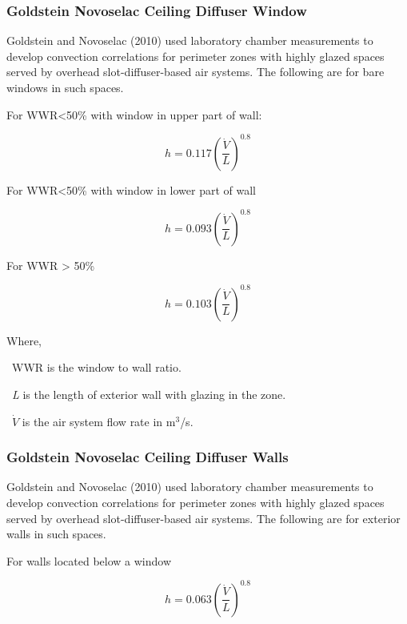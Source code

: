 \subsubsection{Goldstein Novoselac Ceiling Diffuser Window}\label{goldstein-novoselac-ceiling-diffuser-window}

Goldstein and Novoselac (2010) used laboratory chamber measurements to develop convection correlations for perimeter zones with highly glazed spaces served by overhead slot-diffuser-based air systems. The following are for bare windows in such spaces.

For WWR\textless{}50\% with window in upper part of wall:

\begin{equation}
h = 0.117{\left( {\frac{{\dot V}}{L}} \right)^{0.8}}
\end{equation}

For WWR\textless{}50\% with window in lower part of wall

\begin{equation}
h = 0.093{\left( {\frac{{\dot V}}{L}} \right)^{0.8}}
\end{equation}

For WWR \textgreater{} 50\%

\begin{equation}
h = 0.103{\left( {\frac{{\dot V}}{L}} \right)^{0.8}}
\end{equation}

Where,

~WWR is the window to wall ratio.

~\emph{L} is the length of exterior wall with glazing in the zone.

~\(\dot V\) is the air system flow rate in m\(^{3}\)/s.

\subsubsection{Goldstein Novoselac Ceiling Diffuser Walls}\label{goldstein-novoselac-ceiling-diffuser-walls}

Goldstein and Novoselac (2010) used laboratory chamber measurements to develop convection correlations for perimeter zones with highly glazed spaces served by overhead slot-diffuser-based air systems. The following are for exterior walls in such spaces.

For walls located below a window

\begin{equation}
h = 0.063{\left( {\frac{{\dot V}}{L}} \right)^{0.8}}
\end{equation}

